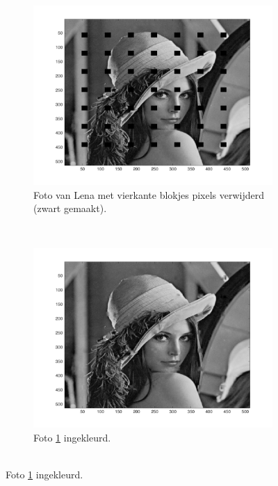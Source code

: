 \begin{figure}
    \centering
    \begin{subfigure}[b]{0.45\textwidth}
        \includegraphics[width=\textwidth]{../src/inpainting/lena_block}
        \caption{Foto van Lena met vierkante blokjes pixels verwijderd (zwart gemaakt). }
        \label{fig:matti_fig_1a}
    \end{subfigure}
    ~ %
    \begin{subfigure}[b]{0.45\textwidth}
        \includegraphics[width=\textwidth]{../src/inpainting/lena_blok_painted_1}
        \caption{Foto \ref{fig:matti_fig_1a} ingekleurd. \\ \ \\}

\end{subfigure}
\end{figure}
